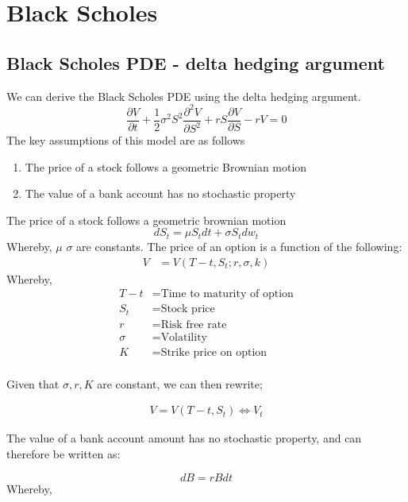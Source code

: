 \documentclass[12pt]{article}
\begin{document}
\section{Black Scholes}
\subsection{Black Scholes PDE - delta hedging argument}
We can derive the Black Scholes PDE using the delta hedging argument.
\begin{equation}
\frac{\partial V}{\partial t} + \frac{1}{2}\sigma^2S^2 \frac{\partial^2 V}{\partial S^2}+rS\frac{\partial V}{\partial S} - rV = 0
\end{equation}
The key assumptions of this model are as follows

\begin{enumerate}
	\item The price of a stock follows a geometric Brownian motion
	\item The value of a bank account has no stochastic property
\end{enumerate}

The price of a stock follows a geometric brownian motion
\begin{equation}
dS_{t}= \mu S_{t} dt + \sigma S_{t} dw_{t}
\end{equation}
Whereby, $\mu$ $\sigma$ are constants. The price of an option is a function of the following:
\begin{align*}
V &= V(T-t, S_{t}; r, \sigma, k)
\end{align*}
Whereby,
\begin{align*}
T - t &= \text{Time to maturity of option} \\
S_{t} &= \text{Stock price} \\
r &= \text{Risk free rate} \\
\sigma &= \text{Volatility} \\
K &= \text{Strike price on option} \\
\end{align*}

Given that $\sigma, r, K$ are constant, we can then rewrite;

\begin{align*}
V = V(T-t,S_{t}) \iff V_{t}
\end{align*}

The value of a bank account amount has no stochastic property, and can therefore be written as:

\begin{equation}
dB = rBdt
\end{equation}
Whereby,
\end{document}

